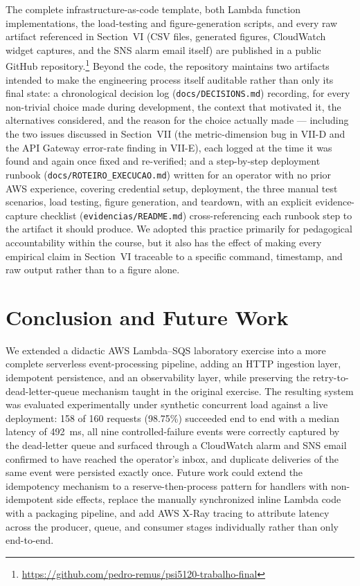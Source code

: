 \documentclass[conference]{IEEEtran}
\begin{document}
The complete infrastructure-as-code template, both Lambda function implementations, the load-testing and figure-generation scripts, and every raw artifact referenced in Section~VI (CSV files, generated figures, CloudWatch widget captures, and the SNS alarm email itself) are published in a public GitHub repository.\footnote{\url{https://github.com/pedro-remus/psi5120-trabalho-final}} Beyond the code, the repository maintains two artifacts intended to make the engineering process itself auditable rather than only its final state: a chronological decision log (\texttt{docs/DECISIONS.md}) recording, for every non-trivial choice made during development, the context that motivated it, the alternatives considered, and the reason for the choice actually made --- including the two issues discussed in Section~VII (the metric-dimension bug in VII-D and the API Gateway error-rate finding in VII-E), each logged at the time it was found and again once fixed and re-verified; and a step-by-step deployment runbook (\texttt{docs/ROTEIRO\_EXECUCAO.md}) written for an operator with no prior AWS experience, covering credential setup, deployment, the three manual test scenarios, load testing, figure generation, and teardown, with an explicit evidence-capture checklist (\texttt{evidencias/README.md}) cross-referencing each runbook step to the artifact it should produce. We adopted this practice primarily for pedagogical accountability within the course, but it also has the effect of making every empirical claim in Section~VI traceable to a specific command, timestamp, and raw output rather than to a figure alone.

\section{Conclusion and Future Work}

We extended a didactic AWS Lambda--SQS laboratory exercise into a more complete serverless event-processing pipeline, adding an HTTP ingestion layer, idempotent persistence, and an observability layer, while preserving the retry-to-dead-letter-queue mechanism taught in the original exercise. The resulting system was evaluated experimentally under synthetic concurrent load against a live deployment: 158 of 160 requests (98.75\%) succeeded end to end with a median latency of 492~ms, all nine controlled-failure events were correctly captured by the dead-letter queue and surfaced through a CloudWatch alarm and SNS email confirmed to have reached the operator's inbox, and duplicate deliveries of the same event were persisted exactly once. Future work could extend the idempotency mechanism to a reserve-then-process pattern for handlers with non-idempotent side effects, replace the manually synchronized inline Lambda code with a packaging pipeline, and add AWS X-Ray tracing to attribute latency across the producer, queue, and consumer stages individually rather than only end-to-end.
\end{document}
